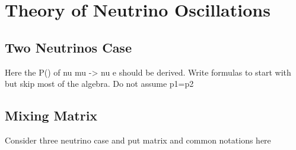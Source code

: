 \section{Theory of Neutrino Oscillations}
\subsection{Two Neutrinos Case}
Here the P() of nu mu -> nu e should be derived. Write formulas to start with but skip most of the algebra. Do not assume p1=p2
\subsection{Mixing Matrix}
Consider three neutrino case and put matrix and common notations here
